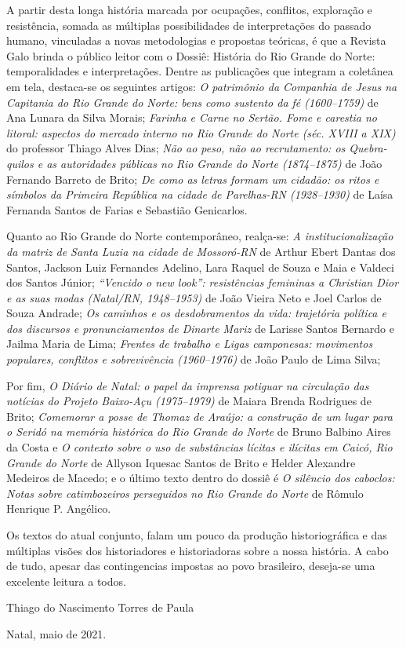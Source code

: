 A partir desta longa história marcada por ocupações, conflitos, exploração e resistência, somada as múltiplas possibilidades de interpretações do passado humano, vinculadas a novas metodologias e propostas teóricas, é que a Revista Galo brinda o público leitor com o Dossiê: História do Rio Grande do Norte: temporalidades e interpretações. Dentre as publicações que integram a coletânea em tela, destaca-se os seguintes artigos: \textit{O patrimônio da Companhia de Jesus na Capitania do Rio Grande do Norte: bens como sustento da fé (1600--1759)} de Ana Lunara da Silva Morais; \textit{Farinha e Carne no Sertão. Fome e carestia no litoral: aspectos do mercado interno no Rio Grande do Norte (séc. XVIII a XIX)} do professor Thiago Alves Dias; \textit{Não ao peso, não ao recrutamento: os Quebra-quilos e as autoridades públicas no Rio Grande do Norte (1874--1875)} de João Fernando Barreto de Brito; \textit{De como as letras formam um cidadão: os ritos e símbolos da Primeira República na cidade de Parelhas-RN (1928--1930)} de Laísa Fernanda Santos de Farias e Sebastião Genicarlos.

Quanto ao Rio Grande do Norte contemporâneo, realça-se: \textit{A institucionalização da matriz de Santa Luzia na cidade de Mossoró-RN} de Arthur Ebert Dantas dos Santos, Jackson Luiz Fernandes Adelino, Lara Raquel de Souza e Maia e Valdeci dos Santos Júnior; \textit{“Vencido o \emph{new look}”: resistências femininas a Christian Dior e as suas modas (Natal/RN, 1948--1953)} de João Vieira Neto e Joel Carlos de Souza Andrade; \textit{Os caminhos e os desdobramentos da vida: trajetória política e dos discursos e pronunciamentos de Dinarte Mariz} de Larisse Santos Bernardo e Jailma Maria de Lima; \textit{Frentes de trabalho e Ligas camponesas: movimentos populares, conflitos e sobrevivência (1960--1976)} de João Paulo de Lima Silva;  

Por fim, \textit{O Diário de Natal: o papel da imprensa potiguar na circulação das notícias do Projeto Baixo-Açu (1975--1979)} de Maiara Brenda Rodrigues de Brito; \textit{Comemorar a posse de Thomaz de Araújo: a construção de um lugar para o \emph{Seridó} na memória histórica do Rio Grande do Norte} de Bruno Balbino Aires da Costa e \textit{O contexto sobre o uso de substâncias lícitas e ilícitas em Caicó, Rio Grande do Norte} de Allyson Iquesac Santos de Brito e Helder Alexandre Medeiros de Macedo; e o último texto dentro do dossiê é \textit{O silêncio dos caboclos: Notas sobre catimbozeiros perseguidos no Rio Grande do Norte} de Rômulo Henrique P. Angélico. 

Os textos do atual conjunto, falam um pouco da produção historiográfica e das múltiplas visões dos historiadores e historiadoras sobre a nossa história. A cabo de tudo, apesar das contingencias impostas ao povo brasileiro, deseja-se uma excelente leitura a todos. 

\bigskip

Thiago do Nascimento Torres de Paula

\bigskip

\hfill Natal, maio de 2021.
